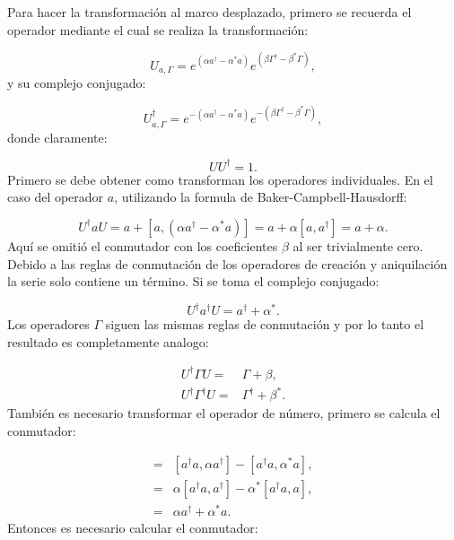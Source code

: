 \documentclass[a4paper,10pt]{report}
\begin{document}
Para hacer la transformación al marco desplazado, primero se recuerda el operador mediante el cual se realiza la transformación:

\begin{equation}
U_{a,\Gamma} = e^{(\alpha a^\dagger - \alpha^*a)}e^{(\beta \Gamma^\dagger - \beta^*\Gamma)},
\end{equation} y su complejo conjugado:

\begin{equation}
U_{a,\Gamma}^{\dagger} = e^{-(\alpha a^\dagger - \alpha^*a)}e^{-(\beta \Gamma^\dagger - \beta^*\Gamma)},
\end{equation} donde claramente:

\begin{equation}
UU^{\dagger} = 1.
\end{equation} Primero se debe obtener como transforman los operadores individuales. En el caso del operador $a$, utilizando la formula de Baker-Campbell-Hausdorff:

\begin{equation}
U^{\dagger}aU = a +[a,(\alpha a^\dagger - \alpha^*a)] = a +\alpha[a,a^{\dagger}]=a+\alpha.
\end{equation} Aquí se omitió el conmutador con los coeficientes $\beta$ al ser trivialmente cero. Debido a las reglas de conmutación de los operadores de creación y aniquilación la serie solo contiene un término. Si se toma el complejo conjugado:

\begin{equation}
U^{\dagger}a^{\dagger}U = a^\dagger + \alpha^*.
\end{equation} Los operadores $\Gamma$ siguen las mismas reglas de conmutación y por lo tanto el resultado es completamente analogo:

\begin{align}
U^{\dagger}\Gamma U =& \Gamma + \beta, \\
U^{\dagger}\Gamma^\dagger U =& \Gamma^\dagger + \beta^*.
\end{align} También es necesario transformar el operador de número, primero se calcula el conmutador:

\begin{align*}
[a^\dagger a,(\alpha a^\dagger - \alpha^*a) ] =& [a^\dagger a,\alpha a^\dagger] - [a^\dagger a,\alpha^*a],\\
=&\alpha [a^\dagger a,a^\dagger] - \alpha^*[a^\dagger a,a],\\
=&\alpha a^{\dagger} + \alpha^* a.
\end{align*} Entonces es necesario calcular el conmutador:
\end{document}
